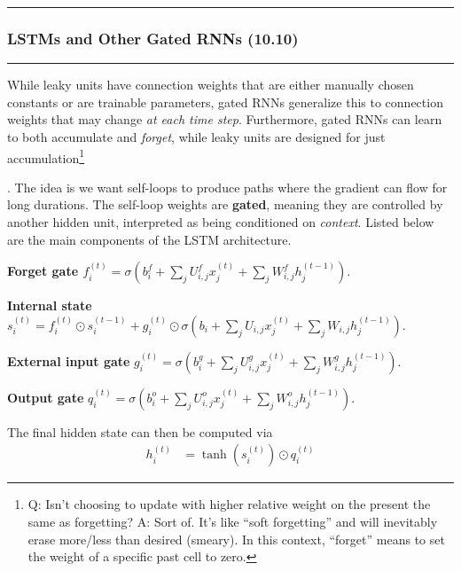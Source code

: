 \documentclass[11pt]{article}
\newcommand\myspace[1][]{\vspace{#1\bigskipamount}}
\newcommand\p{\Needspace{10\baselineskip} \noindent}
\newcommand\subsub[1]{\Needspace{15\baselineskip}\hrule\subsubsection{#1}\hrule}
\begin{document}
\myspace\myspace{}
\subsub{LSTMs and Other Gated RNNs (10.10)}

\p While leaky units have connection weights that are either manually chosen constants or are trainable parameters, gated RNNs generalize this to connection weights that may change \textit{at each time step}. Furthermore, gated RNNs can learn to both accumulate and \textit{forget}, while leaky units are designed for just accumulation\footnote{Q: Isn't choosing to update with higher relative weight on the present the same as forgetting? A: Sort of. It's like ``soft forgetting'' and will inevitably erase more/less than desired (smeary). In this context, ``forget'' means to set the weight of a specific past cell to zero.}

\myspace
\p {}. The idea is we want self-loops to produce paths where the gradient can flow for long durations. The self-loop weights are \textbf{gated}, meaning they are controlled by another hidden unit, interpreted as being conditioned on \textit{context}. Listed below are the main components of the LSTM architecture.
\begin{compactitem}
	\item \textbf{Forget gate $f_i^{(t)} 
		= \sigma\left(b_i^f + \sum_j U_{i,j}^f x_j^{(t)} + \sum_j W_{i,j}^f h_j^{(t-1)}    \right)
		$}. 
	
	\item \textbf{Internal state} $s_i^{(t)}
		= f_i^{(t)} \odot s_i^{(t-1)} + g_i^{(t)} \odot \sigma\left(b_i + \sum_j U_{i,j} x_j^{(t)} + \sum_j W_{i,j} h_j^{(t-1)}  \right)
		$. 
	
	\item \textbf{External input gate} $g_i^{(t)}
	= \sigma\left(b_i^g + \sum_j U_{i,j}^g x_j^{(t)} + \sum_j W_{i,j}^g h_j^{(t-1)}    \right)
	$.
	
	\item \textbf{Output gate} $q_i^{(t)}
	= \sigma\left(b_i^o + \sum_j U_{i,j}^o x_j^{(t)} + \sum_j W_{i,j}^o h_j^{(t-1)}    \right)
	$. 
\end{compactitem}
The final hidden state can then be computed via
\begin{align}
	h_i^{(t)} &= \tanh(s_i^{(t)}) \odot q_i^{(t)}
\end{align}
\end{document}
